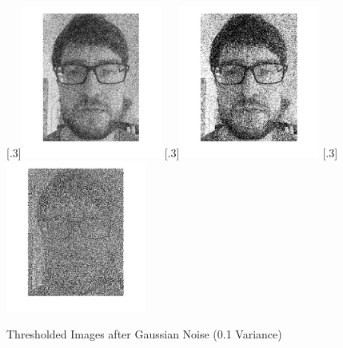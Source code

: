 \documentclass[a4paper]{article}
\begin{document}
	\begin{figure}[H]
		\centering
		[.3\linewidth]{\includegraphics[height=5cm]{Results/Q1/d/qdVar01.jpg}}%
		[.3\linewidth]{\includegraphics[height=5cm]{Results/Q1/d/qdThresh01.jpg}}%
		[.3\linewidth]{\includegraphics[height=5cm]{Results/Q1/d/qd5x501.jpg}}%
		\caption{Thresholded Images after Gaussian Noise (0.1 Variance)}
		\label{fig:}
	\end{figure}
\end{document}
